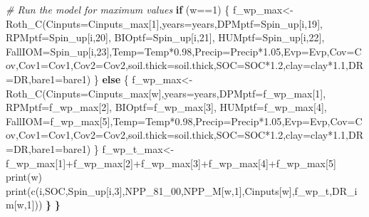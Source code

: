 \documentclass[
  10pt,
  b5paper,
]{book}
\newenvironment{Shaded}{\begin{snugshade}}{\end{snugshade}}
\newcommand{\AttributeTok}[1]{\textcolor[rgb]{0.77,0.63,0.00}{#1}}
\newcommand{\CommentTok}[1]{\textcolor[rgb]{0.56,0.35,0.01}{\textit{#1}}}
\newcommand{\ControlFlowTok}[1]{\textcolor[rgb]{0.13,0.29,0.53}{\textbf{#1}}}
\newcommand{\DecValTok}[1]{\textcolor[rgb]{0.00,0.00,0.81}{#1}}
\newcommand{\ErrorTok}[1]{\textcolor[rgb]{0.64,0.00,0.00}{\textbf{#1}}}
\newcommand{\FloatTok}[1]{\textcolor[rgb]{0.00,0.00,0.81}{#1}}
\newcommand{\FunctionTok}[1]{\textcolor[rgb]{0.00,0.00,0.00}{#1}}
\newcommand{\NormalTok}[1]{#1}
\newcommand{\OtherTok}[1]{\textcolor[rgb]{0.56,0.35,0.01}{#1}}
\newcommand{\SpecialCharTok}[1]{\textcolor[rgb]{0.00,0.00,0.00}{#1}}
\begin{document}
\begin{Shaded}
\begin{Highlighting}[]
\CommentTok{\# Run the model for maximum values}
\ControlFlowTok{if}\NormalTok{ (w}\SpecialCharTok{==}\DecValTok{1}\NormalTok{) \{}
\NormalTok{f\_wp\_max}\OtherTok{\textless{}{-}}\FunctionTok{Roth\_C}\NormalTok{(}\AttributeTok{Cinputs=}\NormalTok{Cinputs\_max[}\DecValTok{1}\NormalTok{],}\AttributeTok{years=}\NormalTok{years,}\AttributeTok{DPMptf=}\NormalTok{Spin\_up[i,}\DecValTok{19}\NormalTok{], }\AttributeTok{RPMptf=}\NormalTok{Spin\_up[i,}\DecValTok{20}\NormalTok{], }\AttributeTok{BIOptf=}\NormalTok{Spin\_up[i,}\DecValTok{21}\NormalTok{], }\AttributeTok{HUMptf=}\NormalTok{Spin\_up[i,}\DecValTok{22}\NormalTok{], }\AttributeTok{FallIOM=}\NormalTok{Spin\_up[i,}\DecValTok{23}\NormalTok{],}\AttributeTok{Temp=}\NormalTok{Temp}\SpecialCharTok{*}\FloatTok{0.98}\NormalTok{,}\AttributeTok{Precip=}\NormalTok{Precip}\SpecialCharTok{*}\FloatTok{1.05}\NormalTok{,}\AttributeTok{Evp=}\NormalTok{Evp,}\AttributeTok{Cov=}\NormalTok{Cov,}\AttributeTok{Cov1=}\NormalTok{Cov1,}\AttributeTok{Cov2=}\NormalTok{Cov2,}\AttributeTok{soil.thick=}\NormalTok{soil.thick,}\AttributeTok{SOC=}\NormalTok{SOC}\SpecialCharTok{*}\FloatTok{1.2}\NormalTok{,}\AttributeTok{clay=}\NormalTok{clay}\SpecialCharTok{*}\FloatTok{1.1}\NormalTok{,}\AttributeTok{DR=}\NormalTok{DR,}\AttributeTok{bare1=}\NormalTok{bare1)}
\NormalTok{\} }\ControlFlowTok{else}\NormalTok{ \{}
\NormalTok{f\_wp\_max}\OtherTok{\textless{}{-}}\FunctionTok{Roth\_C}\NormalTok{(}\AttributeTok{Cinputs=}\NormalTok{Cinputs\_max[w],}\AttributeTok{years=}\NormalTok{years,}\AttributeTok{DPMptf=}\NormalTok{f\_wp\_max[}\DecValTok{1}\NormalTok{], }\AttributeTok{RPMptf=}\NormalTok{f\_wp\_max[}\DecValTok{2}\NormalTok{], }\AttributeTok{BIOptf=}\NormalTok{f\_wp\_max[}\DecValTok{3}\NormalTok{], }\AttributeTok{HUMptf=}\NormalTok{f\_wp\_max[}\DecValTok{4}\NormalTok{], }\AttributeTok{FallIOM=}\NormalTok{f\_wp\_max[}\DecValTok{5}\NormalTok{],}\AttributeTok{Temp=}\NormalTok{Temp}\SpecialCharTok{*}\FloatTok{0.98}\NormalTok{,}\AttributeTok{Precip=}\NormalTok{Precip}\SpecialCharTok{*}\FloatTok{1.05}\NormalTok{,}\AttributeTok{Evp=}\NormalTok{Evp,}\AttributeTok{Cov=}\NormalTok{Cov,}\AttributeTok{Cov1=}\NormalTok{Cov1,}\AttributeTok{Cov2=}\NormalTok{Cov2,}\AttributeTok{soil.thick=}\NormalTok{soil.thick,}\AttributeTok{SOC=}\NormalTok{SOC}\SpecialCharTok{*}\FloatTok{1.2}\NormalTok{,}\AttributeTok{clay=}\NormalTok{clay}\SpecialCharTok{*}\FloatTok{1.1}\NormalTok{,}\AttributeTok{DR=}\NormalTok{DR,}\AttributeTok{bare1=}\NormalTok{bare1)}
\NormalTok{\}}
\NormalTok{f\_wp\_t\_max}\OtherTok{\textless{}{-}}\NormalTok{f\_wp\_max[}\DecValTok{1}\NormalTok{]}\SpecialCharTok{+}\NormalTok{f\_wp\_max[}\DecValTok{2}\NormalTok{]}\SpecialCharTok{+}\NormalTok{f\_wp\_max[}\DecValTok{3}\NormalTok{]}\SpecialCharTok{+}\NormalTok{f\_wp\_max[}\DecValTok{4}\NormalTok{]}\SpecialCharTok{+}\NormalTok{f\_wp\_max[}\DecValTok{5}\NormalTok{]}
\FunctionTok{print}\NormalTok{(w)}
\FunctionTok{print}\NormalTok{(}\FunctionTok{c}\NormalTok{(i,SOC,Spin\_up[i,}\DecValTok{3}\NormalTok{],NPP\_81\_00,NPP\_M[w,}\DecValTok{1}\NormalTok{],Cinputs[w],f\_wp\_t,DR\_im[w,}\DecValTok{1}\NormalTok{]))}
\ErrorTok{\}}
\ErrorTok{\}}
\end{Highlighting}
\end{Shaded}
\end{document}
